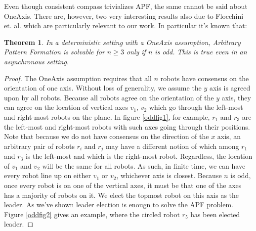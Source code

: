 \documentclass[preprint,10pt]{elsarticle}
\newtheorem{theorem}{Theorem}
\begin{document}
	Even though consistent compass trivializes APF, the same cannot be said about OneAxis. There are, however,
	two very interesting results also due to Flocchini et. al. which are particularly relevant to our work.
	In particular it's known that:
	\begin{theorem} 
		In a deterministic setting with a \textit{OneAxis} assumption, 
		Arbitrary Pattern Formation is solvable for $n \geq 3$ only if $n$ is odd. This is true even in 
		an asynchronous setting.\cite{flocchini08arbitrary}
	\end{theorem} 

	\begin{proof}
		The OneAxis assumption requires that all $n$ robots have consensus on the orientation of one axis. 
		Without loss of generality, we assume the $y$ axis is agreed upon by all robots. Because all robots
		agree on the orientation of the $y$ axis, they can agree on the location of vertical axes $v_1$, 
		$v_2$ which go through the left-most and right-most robots on the plane. In figure \ref{oddfig1}, for example,
		$r_1$ and $r_3$ are the left-most and right-most robots with such axes going through their positions.
		Note that because we do not have consensus on the direction of the $x$ axis, an arbitrary pair of robots
		$r_i$ and $r_j$ may have a different notion of which among $r_1$ and $r_3$ is the left-most and which is
		the right-most robot. Regardless, the location of $v_1$ and $v_2$ will be the same for all robots.
		As such, in finite time, we can have every robot line up on either $v_1$ or $v_2$, whichever
		axis is closest. Because $n$ is odd, once every robot is on one of the vertical axes, it must
		be that one of the axes has a majority of robots on it. We elect the topmost robot
		on this axis as the leader. As we've shown leader election is enougn to solve the APF problem.
		Figure \ref{oddfig2} gives an example, where the circled robot $r_5$ has been elected leader.
	\end{proof}
\end{document}
